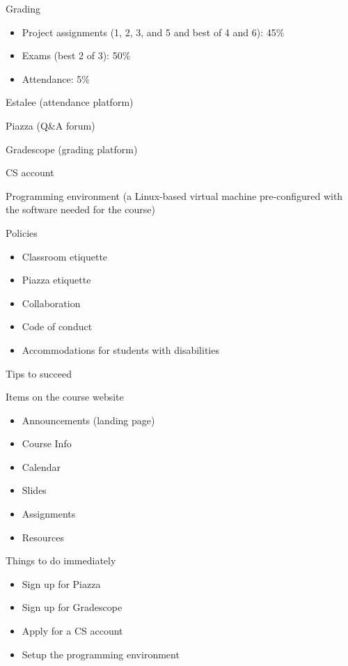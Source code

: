 \documentclass[8pt,a4paper,compress]{beamer}
\begin{document}
\begin{frame}[fragile]
\pause

Grading
\begin{itemize}
\item Project assignments (1, 2, 3, and 5 and best of 4 and 6): 45\%
\item Exams (best 2 of 3): 50\%
\item Attendance: 5\%
\end{itemize}

\pause
\bigskip

Estalee (attendance platform)

\pause
\bigskip

Piazza (Q\&A forum)

\pause
\bigskip

Gradescope (grading platform)

\pause
\bigskip

CS account

\pause
\bigskip

Programming environment (a Linux-based virtual machine pre-configured with the software needed for the course)

\pause
\bigskip

Policies
\begin{itemize}
\item Classroom etiquette
\item Piazza etiquette
\item Collaboration
\item Code of conduct
\item Accommodations for students with disabilities
\end{itemize}
\end{frame}

\begin{frame}[fragile]
\pause

Tips to succeed

\pause
\bigskip

Items on the course website
\begin{itemize}
\item Announcements (landing page)
\item Course Info
\item Calendar
\item Slides 
\item Assignments
\item Resources
\end{itemize}

\pause
\bigskip

Things to do immediately
\begin{itemize}
\item Sign up for Piazza
\item Sign up for Gradescope
\item Apply for a CS account
\item Setup the programming environment
\end{itemize}
\end{frame}
\end{document}
